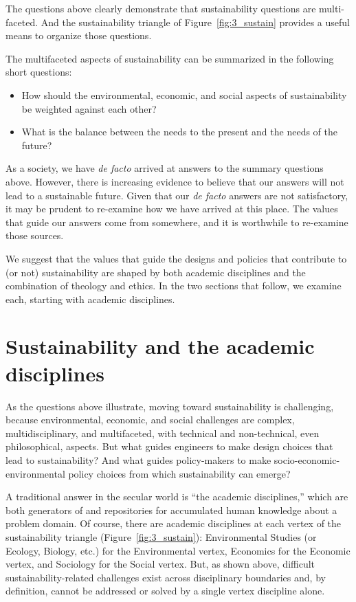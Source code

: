 \documentclass[12pt]{article}
\begin{document}
The questions above clearly demonstrate that sustainability questions are multi-faceted.
And the sustainability triangle of Figure~\ref{fig:3_sustain} provides a useful means to organize those questions.

The multifaceted aspects of sustainability can be summarized in the following short questions:
%
\begin{itemize}

  \item How should the environmental, economic, and social aspects of sustainability be weighted against each other?
  
  \item What is the balance between the needs to the present and the needs of the future?	

\end{itemize}
%
As a society, we have \emph{de facto} arrived at answers to the summary questions above. 
However, there is increasing evidence to believe that our
answers will not lead to a sustainable future.
Given that our \emph{de facto} answers are not satisfactory, 
it may be prudent to re-examine how we have arrived at this place.
The values that guide our answers come from somewhere, and 
it is worthwhile to re-examine those sources.

We suggest that the values that guide the designs and policies that contribute to (or not) sustainability
are shaped by both academic disciplines and the combination of theology and ethics. 
In the two sections that follow, we examine each, 
starting with academic disciplines.


\section{Sustainability and the academic disciplines}
\label{sec:sustainability_and_the_academic_disciplines}

As the questions above illustrate, 
moving toward sustainability is challenging, 
because environmental, economic, and social challenges  
are complex, multidisciplinary, and multifaceted, with 
technical and non-technical, even philosophical, aspects.
But what guides engineers to make design choices that lead to sustainability?
And what guides policy-makers to make socio-economic-environmental
policy choices from which sustainability can emerge?

A traditional answer in the secular world is ``the academic disciplines,'' 
which are both generators of and repositories for accumulated human knowledge
about a problem domain.
Of course, there are academic disciplines 
at each vertex of the sustainability triangle (Figure~\ref{fig:3_sustain}):
Environmental Studies (or Ecology, Biology, etc.) for the Environmental vertex, 
Economics for the Economic vertex, and 
Sociology for the Social vertex.
But, as shown above, difficult sustainability-related 
challenges exist across disciplinary boundaries and, by definition,
cannot be addressed or solved by a single vertex discipline alone.
\end{document}
